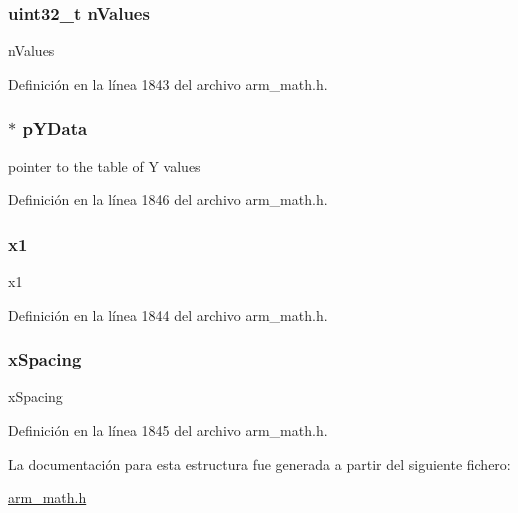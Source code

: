 \subsubsection[{\texorpdfstring{n\+Values}{nValues}}]{\setlength{\rightskip}{0pt plus 5cm}uint32\+\_\+t n\+Values}\hypertarget{structarm__linear__interp__instance__f32_a2ea653b0599388e9a72ebab9841707ba}{}\label{structarm__linear__interp__instance__f32_a2ea653b0599388e9a72ebab9841707ba}
n\+Values 

Definición en la línea 1843 del archivo arm\+\_\+math.\+h.

\subsubsection[{\texorpdfstring{p\+Y\+Data}{pYData}}]{$\ast$ p\+Y\+Data}\hypertarget{structarm__linear__interp__instance__f32_af1489866b69eb5db1e0afeb24c7b01e9}{}\label{structarm__linear__interp__instance__f32_af1489866b69eb5db1e0afeb24c7b01e9}
pointer to the table of Y values 

Definición en la línea 1846 del archivo arm\+\_\+math.\+h.

\subsubsection[{\texorpdfstring{x1}{x1}}]{ x1}\hypertarget{structarm__linear__interp__instance__f32_a795ed79ea4c18d52afe5eb5e868e1c5a}{}\label{structarm__linear__interp__instance__f32_a795ed79ea4c18d52afe5eb5e868e1c5a}
x1 

Definición en la línea 1844 del archivo arm\+\_\+math.\+h.

\subsubsection[{\texorpdfstring{x\+Spacing}{xSpacing}}]{ x\+Spacing}\hypertarget{structarm__linear__interp__instance__f32_a08675584bb57fc42bbb3739c13674346}{}\label{structarm__linear__interp__instance__f32_a08675584bb57fc42bbb3739c13674346}
x\+Spacing 

Definición en la línea 1845 del archivo arm\+\_\+math.\+h.



La documentación para esta estructura fue generada a partir del siguiente fichero\+:\begin{DoxyCompactItemize}
\item 
\hyperlink{arm__math_8h}{arm\+\_\+math.\+h}\end{DoxyCompactItemize}
